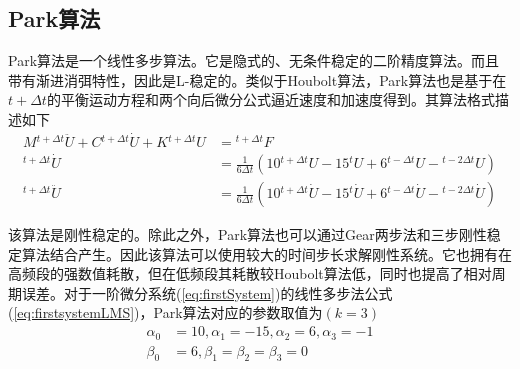\subsection{Park算法}
Park算法是一个线性多步算法。它是隐式的、无条件稳定的二阶精度算法。而且带有渐进消弭特性，因此是L-稳定的。类似于Houbolt算法，Park算法也是基于在$t+\Delta t$的平衡运动方程和两个向后微分公式逼近速度和加速度得到。其算法格式描述如下
\begin{subequations}
\begin{align}
M{^{t+\Delta t}\!\ddot{U}}+C{^{t+\Delta t}\!\dot{U}}+K{^{t+\Delta t}\!U}&={^{t+\Delta t}\!F}\\
{^{t+\Delta t}\!\dot{U}}&=\frac{1}{6\Delta t}(10{^{t+\Delta t}\!U}-15{^{t}\!U}+6{^{t-\Delta t}\!U}-{^{t-2\Delta t}\!U})\\
{^{t+\Delta t}\!\ddot{U}}&=\frac{1}{6\Delta t}(10{^{t+\Delta t}\!\dot{U}}-15{^{t}\!\dot{U}}+6{^{t-\Delta t}\!\dot{U}}-{^{t-2\Delta t}\!\dot{U}})
\end{align}
\end{subequations}

该算法是刚性稳定的。除此之外，Park算法也可以通过Gear两步法\cite{Gear1971a}和三步刚性稳定算法\cite{Gear1971a}结合产生。因此该算法可以使用较大的时间步长求解刚性系统。它也拥有在高频段的强数值耗散，但在低频段其耗散较Houbolt算法低，同时也提高了相对周期误差。对于一阶微分系统(\ref{eq:firstSystem})的线性多步法公式(\ref{eq:firstsystemLMS})，Park算法对应的参数取值为$(k=3)$
\begin{equation}
\begin{split}
\alpha_0&=10,\alpha_1=-15,\alpha_2=6,\alpha_3=-1\\
\beta_0&=6,\beta_1=\beta_2=\beta_3=0
\end{split}
\end{equation}

